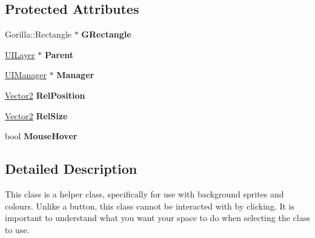 \subsection*{Protected Attributes}
\begin{DoxyCompactItemize}
\item 
\hypertarget{classphys_1_1UI_1_1Rectangle_a2646b0bcc1602757852c21fd70e169cc}{
Gorilla::Rectangle $\ast$ {\bfseries GRectangle}}
\label{d1/d5d/classphys_1_1UI_1_1Rectangle_a2646b0bcc1602757852c21fd70e169cc}

\item 
\hypertarget{classphys_1_1UI_1_1Rectangle_a8685d6c077cc0b5cfe315b9c167db1e7}{
\hyperlink{classphys_1_1UILayer}{UILayer} $\ast$ {\bfseries Parent}}
\label{d1/d5d/classphys_1_1UI_1_1Rectangle_a8685d6c077cc0b5cfe315b9c167db1e7}

\item 
\hypertarget{classphys_1_1UI_1_1Rectangle_a3c78c2e48573d00290f3374e53971a4c}{
\hyperlink{classphys_1_1UIManager}{UIManager} $\ast$ {\bfseries Manager}}
\label{d1/d5d/classphys_1_1UI_1_1Rectangle_a3c78c2e48573d00290f3374e53971a4c}

\item 
\hypertarget{classphys_1_1UI_1_1Rectangle_ae059b550f2d6c490f769bcab07b37910}{
\hyperlink{classphys_1_1Vector2}{Vector2} {\bfseries RelPosition}}
\label{d1/d5d/classphys_1_1UI_1_1Rectangle_ae059b550f2d6c490f769bcab07b37910}

\item 
\hypertarget{classphys_1_1UI_1_1Rectangle_acac4d6cf1b71363d9c27f900b215667e}{
\hyperlink{classphys_1_1Vector2}{Vector2} {\bfseries RelSize}}
\label{d1/d5d/classphys_1_1UI_1_1Rectangle_acac4d6cf1b71363d9c27f900b215667e}

\item 
\hypertarget{classphys_1_1UI_1_1Rectangle_a98b63e58485ebb065c1ad62dc39ac63b}{
bool {\bfseries MouseHover}}
\label{d1/d5d/classphys_1_1UI_1_1Rectangle_a98b63e58485ebb065c1ad62dc39ac63b}

\end{DoxyCompactItemize}


\subsection{Detailed Description}
This class is a helper class, specifically for use with background sprites and colours. Unlike a button, this class cannot be interacted with by clicking. It is important to understand what you want your space to do when selecting the class to use. 

